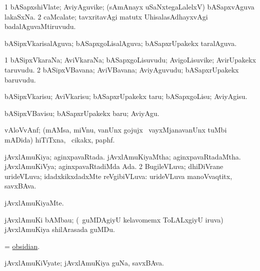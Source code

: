\bentry 
{} 
\gl{\nA}
\expl{}
\bmng
\bnum
\num{1} bASapxshiVlate; AviyAguvike; (sAmAnayx uSaNxtegaLalelxV) bASapxvAguva lakaSxNa. 
\num{2} caMcalate; tavxritavAgi matutx UhisalasAdhayxvAgi badalAguvaMtiruvudu. 
\enum
\emng
\eentry

\bentry
{} 
\gl{\gu}
\expl{}
\bmng
 bASipxVkarisalAguva; bASapxgoLisalAguva; bASapxrUpakekx taralAguva. 
\emng
\eentry

\bentry 
{} 
\gl{\nA}
\expl{}
\bmng
\bnum
\num{1} bASipxVkaraNa; AviVkaraNa; bASapxgoLisuvudu; AvigoLisuvike; AvirUpakekx taruvudu. 
\num{2} bASipxVBavana; AviVBavana; AviyAguvudu; bASapxrUpakekx baruvudu. 
\enum
\emng
\eentry

\bentry 
{} 
\gl{\sakirx}
\expl{}
\bmng
 bASipxVkarisu; AviVkarisu; bASapxrUpakekx taru; bASapxgoLisu; AviyAgisu. 
\emng

\noindent 
\gl{\akirx}
\expl{}
\bmng
 bASipxVBavisu; bASapxrUpakekx baru; AviyAgu. 
\emng
\eentry

\bentry 
{} 
\gl{\nA}
\expl{}
\bmng
 vAloVvAnf; (mAMsa, miVnu, \mo vanUnx gojujx \mo\ vayxMjanavanUnx tuMbi mADida) hiTiTxna, \sA\ cikakx, paphf. 
\emng
\eentry

\bentry
{} 
\gl{\gu}
\expl{}
\bmng
\bnum
{} 
\banum
{} jAvxlAmuKiya; aginxpavaRtada. 
 jAvxlAmuKiyaMtha; aginxpavaRtadaMtha. 
 jAvxlAmuKiVya; aginxpavaRtadiMda Ada. 
\eanum
\numie
\num{2} BugileVLuva; dhiDiVrane urideVLuva; idadxkikxdadxMte reVgibiVLuva:  urideVLuva manoVvaqtitx, savxBAva. 
\enum
\emng
\eentry

\bentry 
{} 
\gl{\kirxvi}
\expl{}
\bmng
 jAvxlAmuKiyaMte. 
\emng
\eentry

\bentry 
{}
\gl{\nA}
\expl{}
\bmng
 jAvxlAmuKi bAMbau; (\sA\ guMDAgiyU kelavomemx ToLALxgiyU iruva) jAvxlAmuKiya shilArasada guMDu. 
\emng
\eentry

\bentry 
{} 
\gl{\nA}
\expl{}
\bmng
 = \hyperref{kandict_o.pdf}{O}{obsidian}{obsidian}. 
\emng
\eentry

\bentry
{} 
\gl{\nA}
\expl{}
\bmng
 jAvxlAmuKiVyate; jAvxlAmuKiya guNa, savxBAva. 
\emng
\eentry

